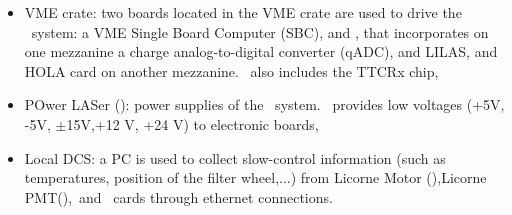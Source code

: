 \begin{itemize}
\item VME crate: two boards located in the VME crate are used to drive the \lasii~system: a VME Single Board Computer (SBC), and \lascar, that incorporates on one mezzanine a charge analog-to-digital converter (qADC), and LILAS, and HOLA card on another mezzanine. \lascar~also includes the TTCRx chip,

\item POwer LASer (\polas): power supplies of the \lasii~system. \polas~provides low voltages (+5V, -5V, $\pm$15V,+12 V, +24 V) to electronic boards,

\item Local DCS: a PC is used to collect slow-control information (such as temperatures, position of the filter wheel,...) from Licorne Motor (\licmot),Licorne PMT(\licpmt),\licphd~and \lascar~cards through ethernet connections.


\end{itemize}